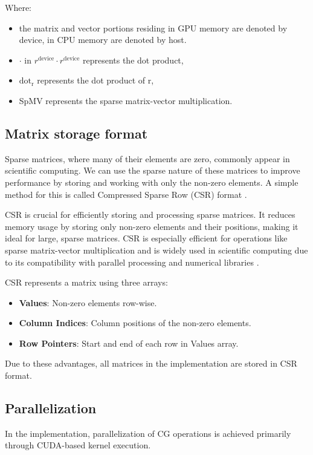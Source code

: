 \documentclass[conference]{IEEEtran}
\begin{document}
Where:

\begin{itemize}
\item the matrix and vector portions residing in GPU memory are denoted by device, in CPU memory are denoted by host.
\item $\cdot$ in $r^{\text{device}} \cdot r^{\text{device}}$ represents the dot product,
\item $\text{dot}_{\text{r}}$ represents the dot product of r,
\item SpMV represents the sparse matrix-vector multiplication.
\end{itemize}

\subsection{Matrix storage format}

Sparse matrices, where many of their elements are zero, commonly appear in scientific computing. We can use the sparse nature of these matrices to improve performance by storing and working with only the non-zero elements. A simple method for this is called Compressed Sparse Row (CSR) format \cite{b1}.

CSR is crucial for efficiently storing and processing sparse matrices. It reduces memory usage by storing only non-zero elements and their positions, making it ideal for large, sparse matrices. CSR is especially efficient for operations like sparse matrix-vector multiplication and is widely used in scientific computing due to its compatibility with parallel processing and numerical libraries \cite{b1}.

CSR represents a matrix using three arrays:
\begin{itemize}
\item \textbf{Values}: Non-zero elements row-wise.
\item \textbf{Column Indices}: Column positions of the non-zero elements.
\item \textbf{Row Pointers}: Start and end of each row in Values array.
\end{itemize}
Due to these advantages, all matrices in the implementation are stored in CSR format.

\subsection{Parallelization}
In the implementation, parallelization of CG operations is achieved primarily through CUDA-based kernel execution.
\end{document}
